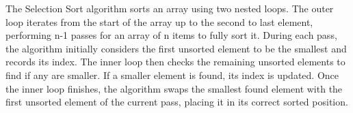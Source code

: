 The Selection Sort algorithm sorts an array using two nested loops. The outer loop iterates from the start of the array up to the second to last element, performing n-1 passes for an array of n items to fully sort it. 
During each pass, the algorithm initially considers the first unsorted element to be the smallest and records its index. The inner loop then checks the remaining unsorted elements to find if any are smaller. If a smaller element is found, its index is updated.
Once the inner loop finishes, the algorithm swaps the smallest found element with the first unsorted element of the current pass, placing it in its correct sorted position.


